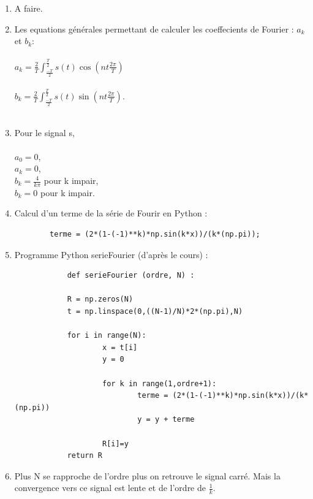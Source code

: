 \documentclass[12pt]{article}
\begin{document}
\begin{enumerate}
	\item
		A faire.
		
	\item
		Les equations générales permettant de calculer les coeffecients de Fourier : $a_k$ et $b_k$: \\\\
		$a_k = \frac{2}{T}\int_{\frac{-T}{2}}^{\frac{T}{2}}s(t)\cos(nt\frac{2\pi}{T})$\\\\
		$b_k = \frac{2}{T}\int_{\frac{-T}{2}}^{\frac{T}{2}}s(t)\sin(nt\frac{2\pi}{T})$.\\\\
	
	\item 
		Pour le signal s, \\\\
		$a_0 = 0$,\\
		$a_k = 0$,\\
		$b_k = \frac{4}{k\pi}$ pour k impair,\\
		$b_k = 0$ pour k impair.
		
	\item
		Calcul d'un terme de la série de Fourir en Python :
		\begin{verbatim}
		terme = (2*(1-(-1)**k)*np.sin(k*x))/(k*(np.pi));
		\end{verbatim}
		
	\item 
		Programme Python serieFourier (d'après le cours) :
		\begin{verbatim}
			def serieFourier (ordre, N) :
					 
			R = np.zeros(N)  
			t = np.linspace(0,((N-1)/N)*2*(np.pi),N)     
			
			for i in range(N):
					x = t[i]           
					y = 0 
					
					for k in range(1,ordre+1):             
							terme = (2*(1-(-1)**k)*np.sin(k*x))/(k*(np.pi))             
							y = y + terme
							
					R[i]=y   
			return R 
		\end{verbatim}
		
	\item
		Plus N se rapproche de l'ordre plus on retrouve le signal carré. Mais la convergence vers ce signal est lente et de l'ordre de $\frac{1}{k}$.
		

\end{enumerate}
\end{document}
